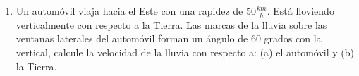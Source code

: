 \documentclass[10pt, a4paper]{article}
\begin{document}
\begin{enumerate}
\begin{enumerate}
            \begin{center}
            \end{center}
       \end{enumerate}

       \item Un automóvil viaja hacia el Este con una rapidez de $50 \si{\frac{km}{h}}$. Está lloviendo
       verticalmente con respecto a la Tierra. Las marcas de la lluvia sobre las ventanas
       laterales del automóvil forman un ángulo de 60 grados con la vertical, calcule la
       velocidad de la lluvia con respecto a: (a) el automóvil y (b) la Tierra.


\end{enumerate}
\end{document}
